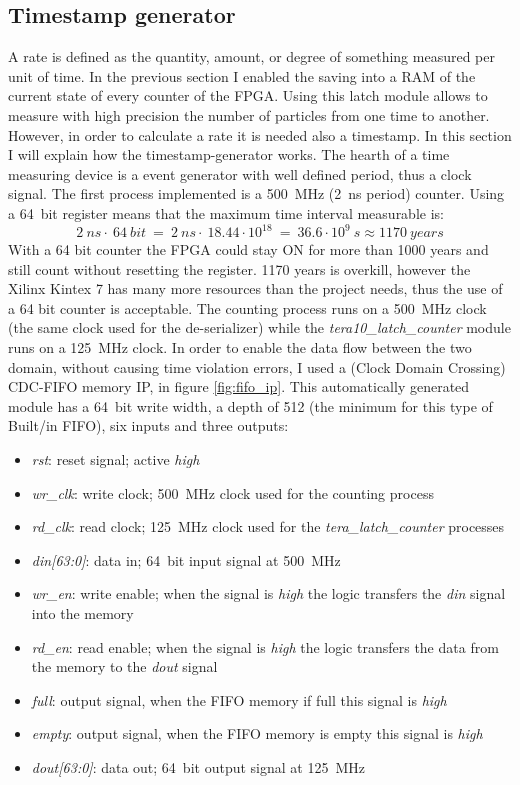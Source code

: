 \subsection{Timestamp generator}\label{Timestamp}
\noindent A rate is defined as the quantity, amount, or degree of something measured per unit of time. In the previous section I enabled the saving into a RAM of the current state of every counter of the FPGA. Using this latch module allows to measure with high precision the number of particles from one time to another. However, in order to calculate a rate it is needed also a timestamp. In this section I will explain how the timestamp-generator works.
The hearth of a time measuring device is a event generator with well defined period, thus a clock signal.
The first process implemented is a 500~MHz (2~ns period) counter.
Using a 64~bit register means that the maximum time interval measurable is:
\begin{equation}
	2 \: ns \cdot \: 64 \: bit \: =\: 2 \: ns \cdot \: 18.44\cdot10^{18} \: = \: 36.6\cdot10^{9} \: s \approx 1170 \: years 
\end{equation}
\noindent With a 64 bit counter the FPGA could stay ON for more than 1000 years and still count without resetting the register. 1170 years is overkill, however the Xilinx Kintex 7 has many more resources than the project needs, thus the use of a 64 bit counter is acceptable.
The counting process runs on a 500~MHz clock (the same clock used for the de-serializer) while the \textit{tera10\_latch\_counter} module runs on a 125~MHz clock. In order to enable the data flow between the two domain, without causing time violation errors, I used a (Clock Domain Crossing) CDC-FIFO memory IP, in figure \ref{fig:fifo_ip}.
This automatically generated module has a 64~bit write width, a depth of 512 (the minimum for this type of Built/in FIFO), six inputs and three outputs:
\begin{itemize}
	\item \textit{rst}: reset signal; active \textit{high}
	\item \textit{wr\_clk}: write clock; 500~MHz clock used for the counting process
	\item \textit{rd\_clk}: read clock; 125~MHz clock used for the \textit{tera\_latch\_counter} processes
	\item \textit{din[63:0]}: data in; 64~bit input signal at 500~MHz
	\item \textit{wr\_en}: write enable; when the signal is \textit{high} the logic transfers the \textit{din} signal into the memory
	\item \textit{rd\_en}: read enable; when the signal is \textit{high} the logic transfers the data from the memory to the \textit{dout} signal
	\item \textit{full}: output signal, when the FIFO memory if full this signal is \textit{high}
	\item \textit{empty}: output signal, when the FIFO memory is empty this signal is \textit{high}
	\item \textit{dout[63:0]}: data out; 64~bit output signal at 125~MHz
\end{itemize}
